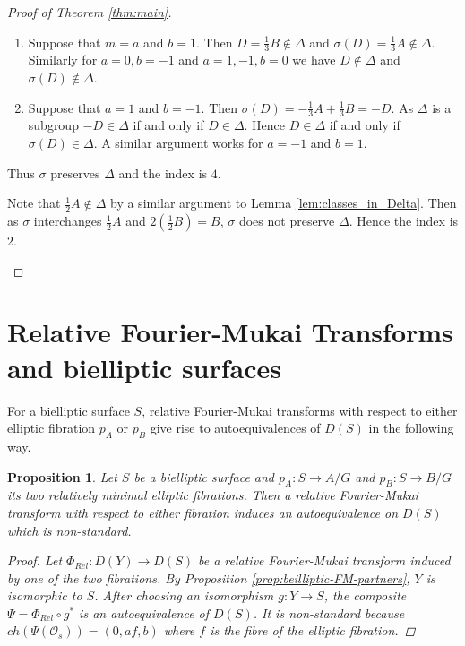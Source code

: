 \documentclass[a4paper, 12pt, twoside]{amsart}
\theoremstyle{plain}
\newtheorem{proposition}[theorem]{Proposition}
\theoremstyle{definition}
\begin{document}
\begin{proof}[Proof of Theorem \ref{thm:main}]
\begin{description}
\begin{enumerate}
  \item Suppose that $m = a$ and $b =1 $. Then
    $D = \frac{1}{3}B \not\in \Delta$ and
    $\sigma(D) = \frac{1}{3}A \not\in \Delta$. Similarly for
    $a=0,b=-1$ and $a=1,-1, b=0 $ we have $D \not\in \Delta$ and
    $\sigma(D) \not\in \Delta$.

  \item Suppose that $a= 1$ and $b=-1$. Then
    $\sigma(D) = -\frac{1}{3}A+ \frac{1}{3}B = -D$.  As $\Delta$ is a
    subgroup $-D \in \Delta$ if and only if $D \in \Delta$. Hence
    $D \in \Delta$ if and only if $\sigma(D) \in \Delta$. A similar
    argument works for $a = -1$ and $b = 1$.
  \end{enumerate}

  Thus $\sigma$ preserves $\Delta$ and the index is $4$.
\item[Bielliptic of type 6] Note that $\frac{1}{2}A \notin \Delta$ by
  a similar argument to Lemma \ref{lem:classes_in_Delta}. Then as
  $\sigma$ interchanges $\frac{1}{2}A$ and $2(\frac{1}{2}B) = B$,
  $\sigma$ does not preserve $\Delta$. Hence the index is $2$.
\end{description}
\end{proof}

\section{Relative Fourier-Mukai Transforms and bielliptic surfaces}
\label{sec:relat-four-mukai-bielliptic}

For a bielliptic surface $S$, relative Fourier-Mukai transforms with
respect to either elliptic fibration $p_A$ or $p_B$ give rise to
autoequivalences of $D(S)$ in the following way.

\begin{proposition}\label{prop:rel-fm-bielliptic}
  Let $S$ be a bielliptic surface and $p_A \colon S \to A/G$ and
  $p_B \colon S \to B/G$ its two relatively minimal elliptic
  fibrations. Then a relative Fourier-Mukai transform with respect to
  either fibration induces an autoequivalence on $D(S)$ which is
  non-standard.
  \begin{proof}
    Let $\Phi_{Rel} \colon D(Y) \to D(S)$ be a relative Fourier-Mukai
    transform induced by one of the two fibrations. By Proposition
    \ref{prop:beilliptic-FM-partners}, $Y$ is isomorphic to $S$. After
    choosing an isomorphism $g \colon Y \to S$, the composite
    $ \Psi = \Phi_{Rel} \circ g^*$ is an autoequivalence of $D(S)$. It
    is non-standard because $ch(\Psi(\mathcal{O}_s)) = (0,af,b)$ where
    $f$ is the fibre of the elliptic fibration.
  \end{proof}
\end{proposition}
\end{document}
